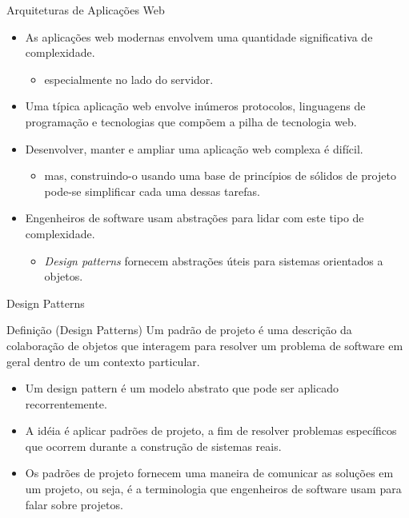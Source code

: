 \begin{frame}{Arquiteturas de Aplicações Web}
  \begin{itemize}
    \item As aplicações \alert{web modernas} envolvem uma quantidade significativa de \alert{complexidade}.
    \begin{itemize}
      \item especialmente no lado do servidor.
    \end{itemize}
    \item Uma típica aplicação web envolve \alert{inúmeros protocolos}, \alert{linguagens de programação} e 
      \alert{tecnologias} que compõem a pilha de tecnologia web. 
    \item Desenvolver, manter e ampliar uma aplicação web complexa é \alert{difícil}.
    \begin{itemize}
      \item mas, construindo-o usando uma \alert{base de princípios de sólidos de projeto} pode-se simplificar 
      cada uma dessas tarefas. 
    \end{itemize}
    \item Engenheiros de software usam \alert{abstrações} para lidar com este tipo de complexidade.
    \begin{itemize}
      \item \textit{Design patterns} fornecem abstrações úteis para sistemas orientados a objetos.
    \end{itemize} 
  \end{itemize}
\end{frame}
\begin{frame}{Design Patterns}
  \begin{exampleblock}{Definição (Design Patterns)}
    Um padrão de projeto é uma descrição da \alert{colaboração de objetos} que interagem para resolver 
    um problema de software em geral dentro de um contexto particular.
  \end{exampleblock}
  \begin{itemize}
    \item Um design pattern é um \alert{modelo abstrato} que pode ser aplicado recorrentemente.
    \item A idéia é aplicar padrões de projeto, a fim de \alert{resolver problemas específicos} que ocorrem 
      durante a construção de sistemas reais.
    \item Os padrões de projeto fornecem uma maneira de \alert{comunicar} as soluções em um projeto, ou seja, 
      é a terminologia que engenheiros de software usam para falar sobre projetos.
  \end{itemize}
\end{frame}
